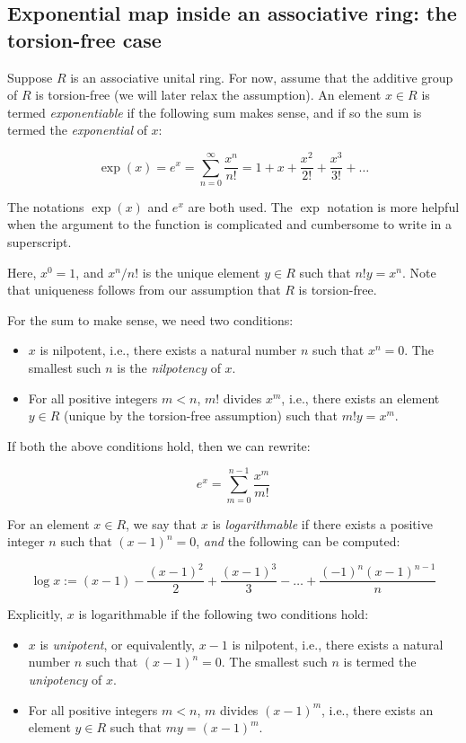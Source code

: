 \documentclass{ucetd}
\begin{document}
\subsection{Exponential map inside an associative ring: the torsion-free case}\label{sec:exp-and-log-unital}

Suppose $R$ is an associative unital ring. For now, assume that the
additive group of $R$ is torsion-free (we will later relax the
assumption). An element $x \in R$ is termed {\em exponentiable} if the
following sum makes sense, and if so the sum is termed the {\em
  exponential} of $x$:

$$\exp(x) = e^x = \sum_{n=0}^\infty \frac{x^n}{n!} = 1 + x + \frac{x^2}{2!} + \frac{x^3}{3!} + \dots$$

The notations $\exp(x)$ and $e^x$ are both used. The $\exp$ notation
is more helpful when the argument to the function is complicated and
cumbersome to write in a superscript.

Here, $x^0 = 1$, and $x^n/n!$ is the unique element $y \in R$ such
that $n!y = x^n$. Note that uniqueness follows from our assumption
that $R$ is torsion-free.

For the sum to make sense, we need two conditions:

\begin{itemize}
\item $x$ is nilpotent, i.e., there exists a natural number $n$ such
  that $x^n = 0$. The smallest such $n$ is the {\em nilpotency} of $x$.
\item For all positive integers $m < n$, $m!$ divides $x^m$, i.e.,
  there exists an element $y \in R$ (unique by the torsion-free
  assumption) such that $m!y = x^m$.
\end{itemize}

If both the above conditions hold, then we can rewrite:

$$e^x = \sum_{m=0}^{n - 1} \frac{x^m}{m!}$$

For an element $x \in R$, we say that $x$ is {\em logarithmable} if
there exists a positive integer $n$ such that $(x - 1)^n = 0$, {\em and} the following can be computed:

$$\log x := (x - 1) - \frac{(x - 1)^2}{2} + \frac{(x - 1)^3}{3} - \dots + \frac{(-1)^n(x - 1)^{n-1}}{n}$$

Explicitly, $x$ is logarithmable if the following two conditions hold:

\begin{itemize}
\item $x$ is {\em unipotent}, or equivalently, $x - 1$ is nilpotent,
  i.e., there exists a natural number $n$ such that $(x - 1)^n =
  0$. The smallest such $n$ is termed the {\em unipotency} of $x$.
\item For all positive integers $m < n$, $m$ divides $(x - 1)^m$,
  i.e., there exists an element $y \in R$ such that $my = (x - 1)^m$.
\end{itemize}
\end{document}
